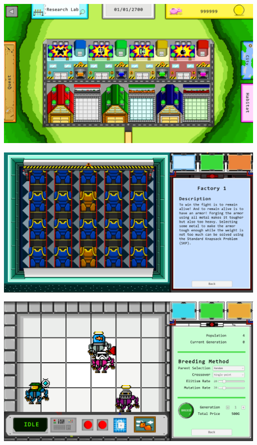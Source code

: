 \documentclass[12pt,oneside,openright,a4paper]{cpe-english-project}
\begin{document}
\begin{minipage}[c]{\textwidth}\centering
\includegraphics[width=14cm]{figure/implement-mainpage.png}
\label{fig:implement-mainpage}
\end{minipage}
\begin{minipage}[c]{\textwidth}\centering
\includegraphics[width=14cm]{figure/implement-factory.png}
\label{fig:implement-factory}
\end{minipage}
\begin{minipage}[c]{\textwidth}\centering
\includegraphics[width=14cm]{figure/implement-farm.png}
\label{fig:implement-farm}
\end{minipage}
\end{document}
